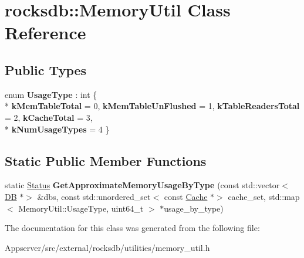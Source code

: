 \hypertarget{classrocksdb_1_1MemoryUtil}{}\section{rocksdb\+:\+:Memory\+Util Class Reference}
\label{classrocksdb_1_1MemoryUtil}
\subsection*{Public Types}
\begin{DoxyCompactItemize}
\item 
enum {\bfseries Usage\+Type} \+: int \{ \\*
{\bfseries k\+Mem\+Table\+Total} = 0, 
{\bfseries k\+Mem\+Table\+Un\+Flushed} = 1, 
{\bfseries k\+Table\+Readers\+Total} = 2, 
{\bfseries k\+Cache\+Total} = 3, 
\\*
{\bfseries k\+Num\+Usage\+Types} = 4
 \}\hypertarget{classrocksdb_1_1MemoryUtil_af3650e6ec0c037d1c973d43c75a18f60}{}\label{classrocksdb_1_1MemoryUtil_af3650e6ec0c037d1c973d43c75a18f60}

\end{DoxyCompactItemize}
\subsection*{Static Public Member Functions}
\begin{DoxyCompactItemize}
\item 
static \hyperlink{classrocksdb_1_1Status}{Status} {\bfseries Get\+Approximate\+Memory\+Usage\+By\+Type} (const std\+::vector$<$ \hyperlink{classrocksdb_1_1DB}{DB} $\ast$$>$ \&dbs, const std\+::unordered\+\_\+set$<$ const \hyperlink{classrocksdb_1_1Cache}{Cache} $\ast$$>$ cache\+\_\+set, std\+::map$<$ Memory\+Util\+::\+Usage\+Type, uint64\+\_\+t $>$ $\ast$usage\+\_\+by\+\_\+type)\hypertarget{classrocksdb_1_1MemoryUtil_af042daefc894bd4f2f4109649be96aec}{}\label{classrocksdb_1_1MemoryUtil_af042daefc894bd4f2f4109649be96aec}

\end{DoxyCompactItemize}


The documentation for this class was generated from the following file\+:\begin{DoxyCompactItemize}
\item 
Appserver/src/external/rocksdb/utilities/memory\+\_\+util.\+h\end{DoxyCompactItemize}
